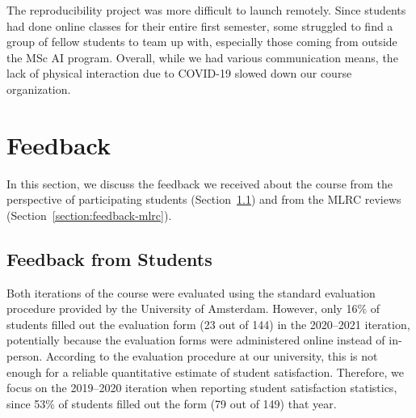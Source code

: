 \documentclass[letterpaper]{article}
\newcommand{\OurUniversity}{the University of Amsterdam}
\begin{document}
The reproducibility project was more difficult to launch remotely.
Since students had done online classes for their entire first semester, some struggled to find a group of fellow students to team up with, especially those coming from outside the MSc AI program.
Overall, while we had various communication means, the lack of physical interaction due to COVID-19 slowed down our course organization.




\section{Feedback}
\label{section:feedback}

In this section, we discuss the feedback we received about the course from the perspective of participating students (Section~\ref{section:feedback-students}) and from the MLRC reviews (Section~\ref{section:feedback-mlrc}).

\subsection{Feedback from Students}
\label{section:feedback-students}
Both iterations of the course were evaluated using the standard evaluation procedure provided by \OurUniversity.
However, only 16\% of students filled out the evaluation form (23 out of 144) in the 2020--2021 iteration, potentially because the evaluation forms were administered online instead of in-person.
According to the evaluation procedure at our university, this is not enough for a reliable quantitative estimate of student satisfaction.
Therefore, we focus on the 2019--2020 iteration when reporting student satisfaction statistics, since 53\% of students filled out the form (79 out of 149) that year.
\end{document}
